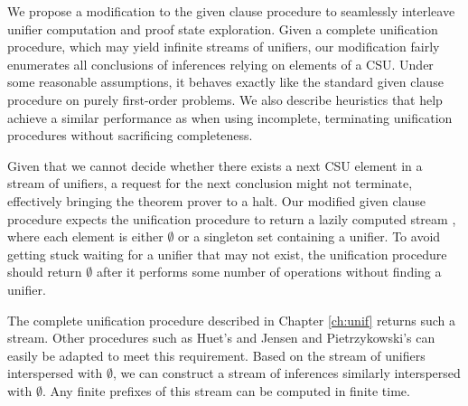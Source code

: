 We propose a modification to the given clause procedure to seamlessly
interleave unifier computation and proof state exploration. Given a complete
unification procedure, which may yield infinite streams of unifiers, our
modification fairly enumerates all conclusions of inferences relying on
elements of a CSU. Under some reasonable assumptions, it behaves exactly like
the standard given clause procedure on purely first-order problems.
We also describe heuristics that help achieve a similar
performance as when using incomplete, terminating unification procedures
without sacrificing completeness.
\pagebreak[2]

Given that we cannot decide whether there exists a next CSU
element in a stream of unifiers, a request for the next conclusion might not
terminate,
effectively bringing the theorem prover to a halt. Our modified given clause procedure
expects the unification procedure to return a lazily computed stream
\cite[Sect.~4.2]{co-1999-funds}, where each element is either $\emptyset$ or
a singleton set containing a unifier. To avoid getting stuck waiting for a unifier
that may not exist, the unification procedure should return
$\emptyset$ after it performs some number of operations without finding a unifier.

The complete unification procedure described in Chapter \ref{ch:unif} returns such a stream. Other procedures such
as Huet's \cite{gh-75-unification} and Jensen and
Pietrzykowski's \cite{jp-76-unif} can easily be adapted to meet this
requirement. Based on the stream of unifiers interspersed with $\emptyset$, we
can construct a stream of inferences similarly interspersed with $\emptyset$.
Any finite prefixes of this stream can be computed in finite time.

